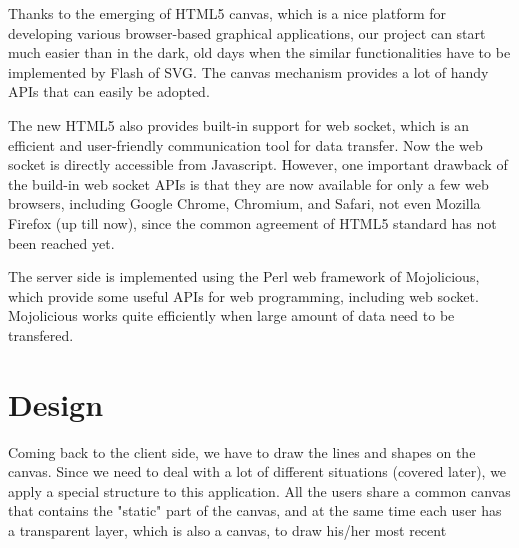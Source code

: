 \documentclass[a4paper,11pt,twocolumn]{article}
\begin{document}
Thanks to the emerging of HTML5 canvas, which is a nice platform for
developing various browser-based graphical applications, our project can start
much easier than in the dark, old days when the similar functionalities have to be
implemented by Flash of SVG. The canvas mechanism provides a lot of handy APIs
that can easily be adopted.

The new HTML5 also provides built-in support for web socket, which is an
efficient and user-friendly communication tool for data transfer. Now the web
socket is directly accessible from Javascript. However, one important drawback
of the build-in web socket APIs is that they are now available for only a few
web browsers, including Google Chrome, Chromium, and Safari, not even
Mozilla Firefox (up till now), since the common agreement of HTML5 standard
has not been reached yet.

The server side is implemented using the Perl web framework of Mojolicious,
which provide some useful APIs for web programming, including web socket.
Mojolicious works quite efficiently when large amount of data need to be
transfered.

\section{Design}

Coming back to the client side, we have to draw the lines and shapes on the
canvas. Since we need to deal with a lot of different situations (covered
later), we apply a special structure to this application. All the users share
a common canvas that contains the "static" part of the canvas, and at the same
time each user has a transparent layer, which is also a canvas, to draw
his/her most recent 
\end{document}
